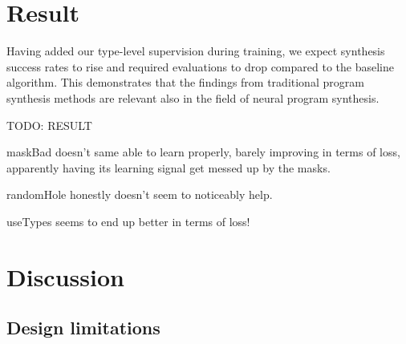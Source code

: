 \documentclass{article}
\begin{document}

\section{Result} %

Having added our type-level supervision during training, we expect synthesis success rates to rise and required evaluations to drop compared to the baseline algorithm.
This demonstrates that the findings from traditional program synthesis methods are relevant also in the field of neural program synthesis.

TODO: RESULT

maskBad doesn't same able to learn properly, barely improving in terms of loss, apparently having its learning signal get messed up by the masks.

randomHole honestly doesn't seem to noticeably help.

useTypes seems to end up better in terms of loss!


\section{Discussion} %


\subsection{Design limitations}
\end{document}
